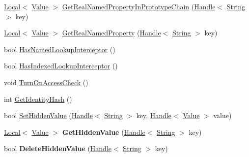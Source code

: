 \begin{DoxyCompactItemize}
\item 
\hyperlink{classv8_1_1_local}{Local}$<$ \hyperlink{classv8_1_1_value}{Value} $>$ \hyperlink{classv8_1_1_object_a36273f157697ff5e8e776a1461755182}{Get\+Real\+Named\+Property\+In\+Prototype\+Chain} (\hyperlink{classv8_1_1_handle}{Handle}$<$ \hyperlink{classv8_1_1_string}{String} $>$ key)
\item 
\hyperlink{classv8_1_1_local}{Local}$<$ \hyperlink{classv8_1_1_value}{Value} $>$ \hyperlink{classv8_1_1_object_a0eeeb35c6dc002a8359ebc445a49e964}{Get\+Real\+Named\+Property} (\hyperlink{classv8_1_1_handle}{Handle}$<$ \hyperlink{classv8_1_1_string}{String} $>$ key)
\item 
bool \hyperlink{classv8_1_1_object_a1e96fcb9ee17101c0299ec68f2cf8610}{Has\+Named\+Lookup\+Interceptor} ()
\item 
bool \hyperlink{classv8_1_1_object_a278913bcd203434870ce5184a538a9af}{Has\+Indexed\+Lookup\+Interceptor} ()
\item 
void \hyperlink{classv8_1_1_object_a6e9fe342c0f77995defa6b479d01a3bd}{Turn\+On\+Access\+Check} ()
\item 
int \hyperlink{classv8_1_1_object_ac1ece41e81a499920ec3a2a3471653bc}{Get\+Identity\+Hash} ()
\item 
bool \hyperlink{classv8_1_1_object_a2200482b09feb914dc91d8256671f7f0}{Set\+Hidden\+Value} (\hyperlink{classv8_1_1_handle}{Handle}$<$ \hyperlink{classv8_1_1_string}{String} $>$ key, \hyperlink{classv8_1_1_handle}{Handle}$<$ \hyperlink{classv8_1_1_value}{Value} $>$ value)
\item 
\hypertarget{classv8_1_1_object_a0fb148558e1749b04a2e13b2c9fa4441}{}\hyperlink{classv8_1_1_local}{Local}$<$ \hyperlink{classv8_1_1_value}{Value} $>$ {\bfseries Get\+Hidden\+Value} (\hyperlink{classv8_1_1_handle}{Handle}$<$ \hyperlink{classv8_1_1_string}{String} $>$ key)\label{classv8_1_1_object_a0fb148558e1749b04a2e13b2c9fa4441}

\item 
\hypertarget{classv8_1_1_object_ab1d274da1949b1f68087728760ee4172}{}bool {\bfseries Delete\+Hidden\+Value} (\hyperlink{classv8_1_1_handle}{Handle}$<$ \hyperlink{classv8_1_1_string}{String} $>$ key)\label{classv8_1_1_object_ab1d274da1949b1f68087728760ee4172}


\end{DoxyCompactItemize}
